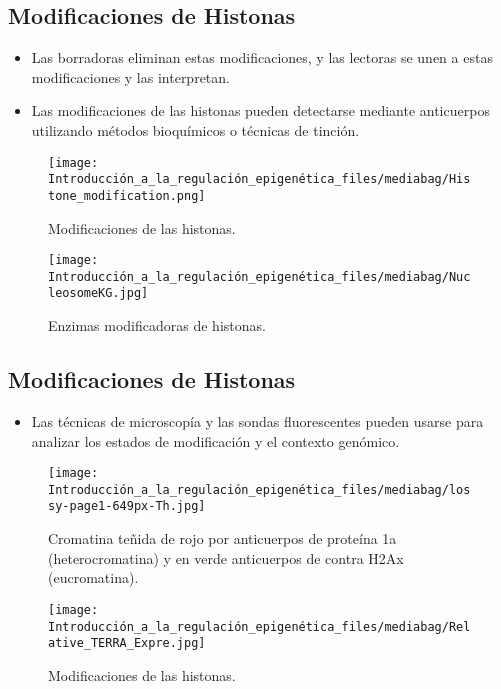 \documentclass[
  letterpaper,
  DIV=11,
  numbers=noendperiod]{scrartcl}
\providecommand{\tightlist}{%
  \setlength{\itemsep}{0pt}\setlength{\parskip}{0pt}}\usepackage{longtable,booktabs,array}
\begin{document}
\subsection{Modificaciones de
Histonas}\label{modificaciones-de-histonas-1}

\begin{itemize}
\tightlist
\item
  Las borradoras eliminan estas modificaciones, y las lectoras se unen a
  estas modificaciones y las interpretan.
\item
  Las modificaciones de las histonas pueden detectarse mediante
  anticuerpos utilizando métodos bioquímicos o técnicas de tinción.
\end{itemize}

\begin{figure}[H]

{\centering \texttt{[image: Introducción\_a\_la\_regulación\_epigenética\_files/mediabag/Histone\_modification.png]}

}

\caption{Modificaciones de las histonas.}

\end{figure}%
\begin{figure}[H]

{\centering \texttt{[image: Introducción\_a\_la\_regulación\_epigenética\_files/mediabag/NucleosomeKG.jpg]}

}

\caption{Enzimas modificadoras de histonas.}

\end{figure}%

\subsection{Modificaciones de
Histonas}\label{modificaciones-de-histonas-2}

\begin{itemize}
\tightlist
\item
  Las técnicas de microscopía y las sondas fluorescentes pueden usarse
  para analizar los estados de modificación y el contexto genómico.
\end{itemize}

\begin{figure}[H]

{\centering \texttt{[image: Introducción\_a\_la\_regulación\_epigenética\_files/mediabag/lossy-page1-649px-Th.jpg]}

}

\caption{Cromatina teñida de rojo por anticuerpos de proteína 1a
(heterocromatina) y en verde anticuerpos de contra H2Ax (eucromatina).}

\end{figure}%
\begin{figure}[H]

{\centering \texttt{[image: Introducción\_a\_la\_regulación\_epigenética\_files/mediabag/Relative\_TERRA\_Expre.jpg]}

}

\caption{Modificaciones de las histonas.}

\end{figure}%
\end{document}
